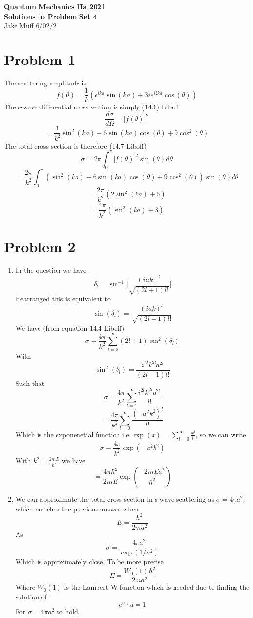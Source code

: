 \documentclass[12pt]{article}
\begin{document}
\normalsize

\baselineskip 14pt

\begin{center}
{\Large {\bf Quantum Mechanics IIa 2021 \ \ \\ Solutions to Problem Set 4}} \\
Jake Muff
6/02/21
\end{center}
\section*{Problem 1}
The scattering amplitude is 
$$ f(\theta) = \frac{1}{k} (e^{ika} \sin (ka) + 3i e^{i2ka} \cos(\theta)) $$
The s-wave differential cross section is simply (14.6) Liboff
$$\frac{d \sigma}{d \Omega} = | f(\theta) |^2 $$
$$ = \frac{1}{k^2} \sin^2(ka)-6 \sin(ka) \cos(\theta) + 9 \cos^2(\theta)$$
The total cross section is therefore (14.7 Liboff)
$$ \sigma = 2 \pi \int_0^{\pi} | f(\theta) |^2 \sin(\theta) d \theta $$
$$ = \frac{2 \pi}{k^2} \int_0^{\pi} (\sin^2 (ka) -6 \sin(ka) \cos(\theta) + 9 \cos^2 (\theta) ) \sin(\theta) d \theta $$
$$ = \frac{2 \pi}{k^2} (2 \sin^2(ka) +6) $$
$$ = \frac{4 \pi}{k^2} ( \sin^2(ka) +3) $$


\section*{Problem 2} 
\begin{enumerate}
    \item %
    In the question we have 
    $$ \delta_l = \sin^{-1} \Big[ \frac{(iak)^l}{\sqrt{(2l+1)l!}}\Big] $$
    Rearranged this is equivalent to 
    $$ \sin (\delta_l)  = \frac{(iak)^l}{\sqrt{(2l+1)l!}} $$
    We have (from equation 14.4 Liboff) 
    $$ \sigma = \frac{4 \pi}{k^2} \sum_{l=0}^{\infty} (2l+1) \sin^2 (\delta_l) $$
    With
    $$ \sin^2 (\delta_l) = \frac{i^{2l} k^{2l} a^{2l}}{(2l+1)l!} $$
    Such that 
    $$ \sigma = \frac{4 \pi }{k^2} \sum_{l=0}^{\infty} \frac{i^{2l} k^{2l} a^{2l} }{l!} $$
    $$ = \frac{4 \pi}{k^2} \sum_{l=0}^{\infty} \frac{(-a^2 k^2)^l}{l!} $$
    Which is the exponenetial function i.e $\exp(x) = \sum_{l=0}^{\infty} \frac{x^l}{l!} $, so we can write 
    $$ \sigma = \frac{4 \pi}{k^2} \exp(-a^2 k^2) $$
    With $k^2 = \frac{2mE}{\hbar^2} $ we have 
    $$ = \frac{4 \pi \hbar^2}{2mE} \exp(\frac{-2mE a^2}{\hbar^2}) $$

    \item We can approximate the total cross section in s-wave scattering as $\sigma = 4 \pi a^2$, which matches
    the previous answer when 
    $$ E = \frac{\hbar^2}{2 m a^2} $$ 
    As 
    $$ \sigma = \frac{4 \pi a^2}{\exp(1/a^2)} $$
    Which is approximately close. To be more precise 
    $$ E = \frac{W_0(1) \hbar^2}{2ma^2} $$
    Where $W_0(1)$ is the Lambert W function which is needed due to finding the solution of 
    $$ e^u \cdot u = 1$$
    For $\sigma=4 \pi a^2$ to hold. 
\end{enumerate}
\end{document}
